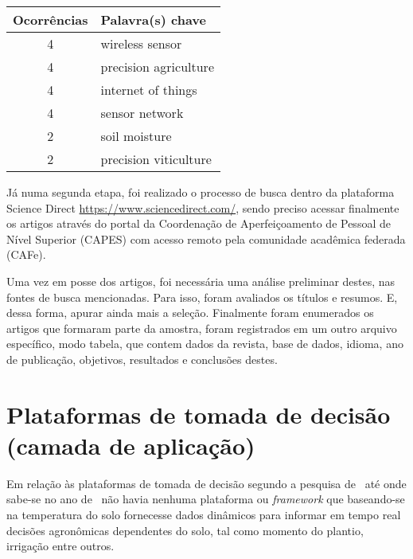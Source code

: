 \documentclass[
article,			%
12pt,				%
oneside,			%
a4paper,			%
english,			%
brazil,				%
sumario=tradicional
]{abntex2}
\begin{document}
\begin{table}[!htb]
  \centering
  \begin{tabular}{|c|l|}
    \hline
    \textbf{Ocorrências} & \textbf{Palavra(s) chave} \\ \hline
    4                    & wireless sensor           \\ \hline
    4                    & precision agriculture     \\ \hline
    4                    & internet of things        \\ \hline
    4                    & sensor network            \\ \hline
    2                    & soil moisture             \\ \hline
    2                    & precision viticulture     \\ \hline
  \end{tabular}
\end{table}

Já numa segunda etapa, foi realizado o processo de busca dentro da plataforma Science Direct \url{https://www.sciencedirect.com/}, sendo preciso acessar finalmente os artigos através do portal da Coordenação de Aperfeiçoamento de Pessoal de Nível Superior (CAPES) com acesso remoto pela comunidade acadêmica federada (CAFe).

Uma vez em posse dos artigos, foi necessária uma análise preliminar destes, nas fontes de busca mencionadas. Para isso, foram avaliados os títulos e resumos. E, dessa forma, apurar ainda mais a seleção. Finalmente foram enumerados os artigos que formaram parte da amostra, foram registrados em um outro arquivo específico, modo tabela, que contem dados da revista, base de dados, idioma, ano de publicação, objetivos, resultados e conclusões destes.

\section{Plataformas de tomada de decisão (camada de aplicação)}\label{Plataformas de tomada de decisão}%
Em relação às plataformas de tomada de decisão segundo a pesquisa de~\citeauthor{1} até onde sabe-se no ano de~\citeyear{1} não havia nenhuma plataforma ou \textit{framework} que baseando-se na temperatura do solo fornecesse dados dinâmicos para informar em tempo real decisões agronômicas dependentes do solo, tal como momento do plantio, irrigação entre outros.
\end{document}
